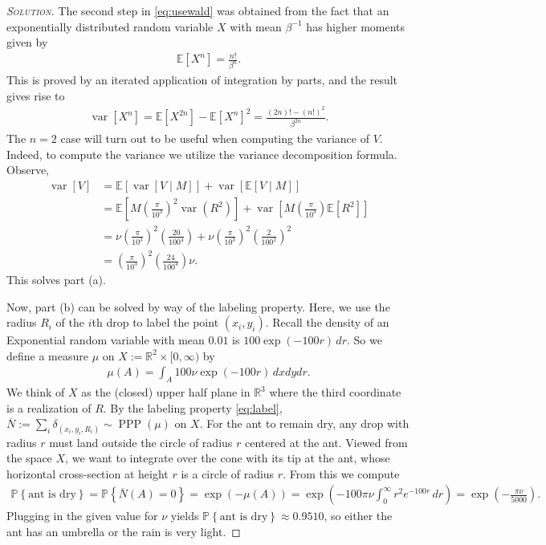 \documentclass[11pt]{article}
\newenvironment{soln}{\begin{proof}[\textsc{Solution}]}{\renewcommand{\qedsymbol}{$\blacklozenge$}\end{proof}}
\begin{document}
\begin{example}
\begin{soln}
	The second step in \eqref{eq:usewald} was obtained from the fact that an exponentially distributed random variable $X$ with mean $\beta^{-1}$ has higher moments given by
	\begin{align}
		\mathbb{E}\left[ X^n \right] = \frac{n!}{\beta^n}.
	\end{align}
	This is proved by an iterated application of integration by parts, and the result gives rise to 
	\begin{align}
		\operatorname{var}\left[ X^n \right] = \mathbb{E}\left[ X^{2n} \right] - \mathbb{E}\left[ X^n \right]^2 = \frac{(2n)! - (n!)^2}{\beta^{2n}}.
	\end{align}
	The $n=2$ case will turn out to be useful when computing the variance of $V$.
	\newpage
	Indeed, to compute the variance we utilize the variance decomposition formula. Observe,
	\begin{align}
		\operatorname{var}[V] &= \mathbb{E}\left[ \operatorname{var}[V \mid M]\right] + \operatorname{var}\left[ \mathbb{E}[V \mid M ]\right]\\
		&= \mathbb{E}\left[ M\left(\frac{\pi}{10^3}\right)^2\operatorname{var}(R^2)\right] + \operatorname{var}\left[ M\left(\frac{\pi}{10^3}\right)\mathbb{E}[R^2]\right]\\
		&= \nu \left(\frac{\pi}{10^3}\right)^2 \left(\frac{20}{100^4}\right) + \nu\left(\frac{\pi}{10^3}\right)^2 \left(\frac{2}{100^2}\right)^2\\
		&= \left(\frac{\pi}{10^3}\right)^2\left(\frac{24}{100^4}\right)\nu.
	\end{align}
	This solves part (a).
	
	Now, part (b) can be solved by way of the labeling property. Here, we use the radius $R_i$ of the $i$th drop to label the point $(x_i,y_i)$. Recall the density of an Exponential random variable with mean $0.01$ is $100\exp(-100r)\,dr$. So we define a measure $\mu$ on $X:=\mathbb{R}^2\times [0,\infty)$ by
	\begin{align}
		\mu(A) = \int_A\! 100\nu\exp(-100r)\, dxdydr.
	\end{align} 
	We think of $X$ as the (closed) upper half plane in $\mathbb{R}^3$ where the third coordinate is a realization of $R$. By the labeling property \eqref{eq:label}, $\overline{N} := \sum_i \delta_{(x_i,y_i,R_i)} \sim \operatorname{PPP}(\mu)$ on $X$. For the ant to remain dry, any drop with radius $r$ must land outside the circle of radius $r$ centered at the ant. Viewed from the space $X$, we want to integrate over the cone with its tip at the ant, whose horizontal cross-section at height $r$ is a circle of radius $r$. From this we compute
	\begin{align}
		\mathbb{P}\left\{\text{ant is dry}\right\} = \mathbb{P}\left\{\overline{N}(A) = 0\right\}
		= \exp(-\mu(A))
		= \exp\left(-100\pi\nu\int_0^\infty\! r^2e^{-100r}\,dr\right)
		= \exp\left( -\frac{\pi\nu}{5000} \right).
	\end{align}
	Plugging in the given value for $\nu$ yields $\mathbb{P}\left\{\text{ant is dry}\right\} \approx 0.9510$, so either the ant has an umbrella or the rain is very light.
\end{soln}
\end{example}
\end{document}

